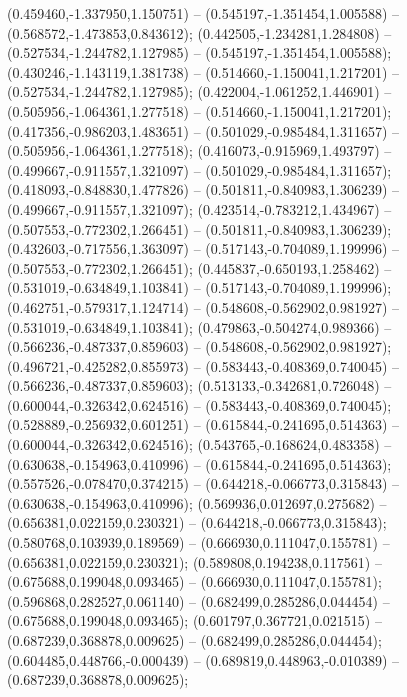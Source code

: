  (0.459460,-1.337950,1.150751) -- (0.545197,-1.351454,1.005588) -- (0.568572,-1.473853,0.843612);
 (0.442505,-1.234281,1.284808) -- (0.527534,-1.244782,1.127985) -- (0.545197,-1.351454,1.005588);
 (0.430246,-1.143119,1.381738) -- (0.514660,-1.150041,1.217201) -- (0.527534,-1.244782,1.127985);
 (0.422004,-1.061252,1.446901) -- (0.505956,-1.064361,1.277518) -- (0.514660,-1.150041,1.217201);
 (0.417356,-0.986203,1.483651) -- (0.501029,-0.985484,1.311657) -- (0.505956,-1.064361,1.277518);
 (0.416073,-0.915969,1.493797) -- (0.499667,-0.911557,1.321097) -- (0.501029,-0.985484,1.311657);
 (0.418093,-0.848830,1.477826) -- (0.501811,-0.840983,1.306239) -- (0.499667,-0.911557,1.321097);
 (0.423514,-0.783212,1.434967) -- (0.507553,-0.772302,1.266451) -- (0.501811,-0.840983,1.306239);
 (0.432603,-0.717556,1.363097) -- (0.517143,-0.704089,1.199996) -- (0.507553,-0.772302,1.266451);
 (0.445837,-0.650193,1.258462) -- (0.531019,-0.634849,1.103841) -- (0.517143,-0.704089,1.199996);
 (0.462751,-0.579317,1.124714) -- (0.548608,-0.562902,0.981927) -- (0.531019,-0.634849,1.103841);
 (0.479863,-0.504274,0.989366) -- (0.566236,-0.487337,0.859603) -- (0.548608,-0.562902,0.981927);
 (0.496721,-0.425282,0.855973) -- (0.583443,-0.408369,0.740045) -- (0.566236,-0.487337,0.859603);
 (0.513133,-0.342681,0.726048) -- (0.600044,-0.326342,0.624516) -- (0.583443,-0.408369,0.740045);
 (0.528889,-0.256932,0.601251) -- (0.615844,-0.241695,0.514363) -- (0.600044,-0.326342,0.624516);
 (0.543765,-0.168624,0.483358) -- (0.630638,-0.154963,0.410996) -- (0.615844,-0.241695,0.514363);
 (0.557526,-0.078470,0.374215) -- (0.644218,-0.066773,0.315843) -- (0.630638,-0.154963,0.410996);
 (0.569936,0.012697,0.275682) -- (0.656381,0.022159,0.230321) -- (0.644218,-0.066773,0.315843);
 (0.580768,0.103939,0.189569) -- (0.666930,0.111047,0.155781) -- (0.656381,0.022159,0.230321);
 (0.589808,0.194238,0.117561) -- (0.675688,0.199048,0.093465) -- (0.666930,0.111047,0.155781);
 (0.596868,0.282527,0.061140) -- (0.682499,0.285286,0.044454) -- (0.675688,0.199048,0.093465);
 (0.601797,0.367721,0.021515) -- (0.687239,0.368878,0.009625) -- (0.682499,0.285286,0.044454);
 (0.604485,0.448766,-0.000439) -- (0.689819,0.448963,-0.010389) -- (0.687239,0.368878,0.009625);

